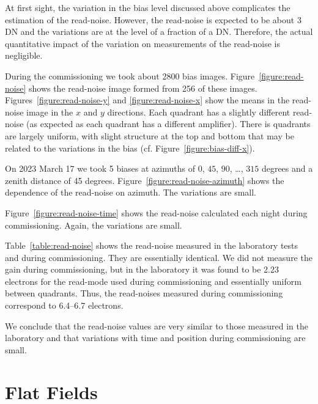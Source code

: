 \documentclass{article}
\begin{document}
At first sight, the variation in the bias level discussed above complicates the estimation of the read-noise. However, the read-noise is expected to be about 3 DN and the variations are at the level of a fraction of a DN. Therefore, the actual quantitative impact of the variation on measurements of the read-noise is negligible.

During the commissioning we took about 2800 bias images. Figure~\ref{figure:read-noise} shows the read-noise image formed from 256 of these images. Figures~\ref{figure:read-noise-y} and \ref{figure:read-noise-x} show the means in the read-noise image in the $x$ and $y$ directions. Each quadrant has a slightly different read-noise (as expected as each quadrant has a different amplifier). There is quadrants are largely uniform, with slight structure at the top and bottom that may be related to the variations in the bias (cf. Figure~\ref{figure:bias-diff-x}).

On 2023 March 17 we took 5 biases at azimuths of $0$, $45$, $90$, \ldots, $315$ degrees and a zenith distance of 45 degrees. Figure~\ref{figure:read-noise-azimuth} shows the dependence of the read-noise on azimuth. The variations are small.

Figure~\ref{figure:read-noise-time} shows the read-noise calculated each night during commissioning. Again, the variations are small.

Table~\ref{table:read-noise} shows the read-noise measured in the laboratory tests \cite{laboratory} and during commissioning. They are essentially identical. We did not measure the gain during commissioning, but in the laboratory it was found to be 2.23 electrons for the read-mode used during commissioning and essentially uniform between quadrants. Thus, the read-noises measured during commissioning correspond to 6.4--6.7 electrons.

We conclude that the read-noise values are very similar to those measured in the laboratory and that variations with time and position during commissioning are small.

\clearpage
\section{Flat Fields}
\end{document}

